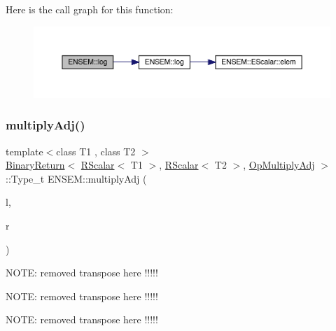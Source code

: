 Here is the call graph for this function\+:\nopagebreak
\begin{figure}[H]
\begin{center}
\leavevmode
\includegraphics[width=350pt]{d9/ded/group__rscalar_gacf4bc45f226554e38012a20a649605ed_cgraph}
\end{center}
\end{figure}
\mbox{\label{group__rscalar_ga5b26c70325ac5d320cfd53d629b3d0c4}} 
\subsubsection{\texorpdfstring{multiplyAdj()}{multiplyAdj()}}
{\footnotesize\ttfamily template$<$class T1 , class T2 $>$ \\
\mbox{\hyperlink{structENSEM_1_1BinaryReturn}{Binary\+Return}}$<$ \mbox{\hyperlink{classENSEM_1_1RScalar}{R\+Scalar}}$<$ T1 $>$, \mbox{\hyperlink{classENSEM_1_1RScalar}{R\+Scalar}}$<$ T2 $>$, \mbox{\hyperlink{structENSEM_1_1OpMultiplyAdj}{Op\+Multiply\+Adj}} $>$\+::Type\+\_\+t E\+N\+S\+E\+M\+::multiply\+Adj (\begin{DoxyParamCaption}\item[{const \mbox{\hyperlink{classENSEM_1_1RScalar}{R\+Scalar}}$<$ T1 $>$ \&}]{l,  }\item[{const \mbox{\hyperlink{classENSEM_1_1RScalar}{R\+Scalar}}$<$ T2 $>$ \&}]{r }\end{DoxyParamCaption})\hspace{0.3cm}{\ttfamily [inline]}}

N\+O\+TE\+: removed transpose here !!!!!

N\+O\+TE\+: removed transpose here !!!!!

N\+O\+TE\+: removed transpose here !!!!! \mbox{\label{group__rscalar_ga389f96c37c3b933acfc68be93291ae0e}} 
